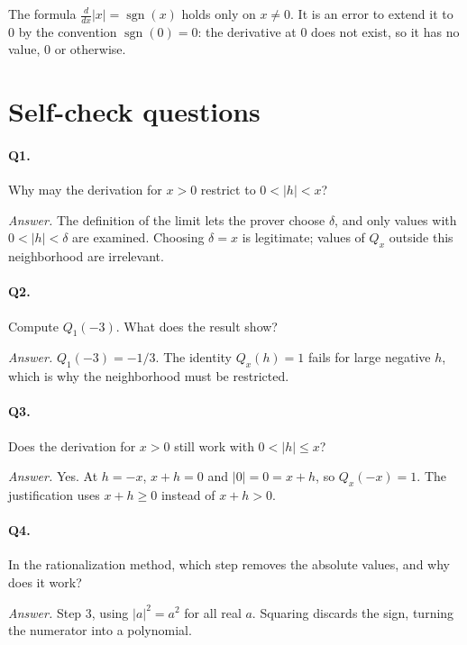 \documentclass{essay}
\DeclareMathOperator{\sgn}{sgn}
\newcommand{\abs}[1]{\lvert #1 \rvert}
\begin{document}
\begin{remark}
  The formula $\frac{d}{dx}\abs{x} = \sgn(x)$ holds only on $x \neq 0$. It is an
  error to extend it to $0$ by the convention $\sgn(0) = 0$: the derivative at
  $0$ does not exist, so it has no value, $0$ or otherwise.
\end{remark}

\section{Self-check questions}

\paragraph{Q1.} Why may the derivation for $x > 0$ restrict to
$0 < \abs{h} < x$?

\noindent\textit{Answer.} The definition of the limit lets the prover choose
$\delta$, and only values with $0 < \abs{h} < \delta$ are examined. Choosing
$\delta = x$ is legitimate; values of $Q_x$ outside this neighborhood are
irrelevant.

\paragraph{Q2.} Compute $Q_1(-3)$. What does the result show?

\noindent\textit{Answer.} $Q_1(-3) = -1/3$. The identity $Q_x(h) = 1$ fails
for large negative $h$, which is why the neighborhood must be restricted.

\paragraph{Q3.} Does the derivation for $x > 0$ still work with
$0 < \abs{h} \leq x$?

\noindent\textit{Answer.} Yes. At $h = -x$, $x + h = 0$ and $\abs{0} = 0 = x + h$,
so $Q_x(-x) = 1$. The justification uses $x + h \geq 0$ instead of
$x + h > 0$.

\paragraph{Q4.} In the rationalization method, which step removes the absolute
values, and why does it work?

\noindent\textit{Answer.} Step 3, using $\abs{a}^2 = a^2$ for all real $a$.
Squaring discards the sign, turning the numerator into a polynomial.
\end{document}

